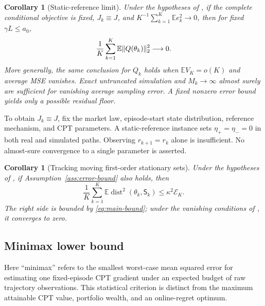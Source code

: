 \documentclass[11pt]{article}
\newtheorem{corollary}[theorem]{Corollary}
\newcommand{\E}{\mathbb E}
\newcommand{\1}{\mathbf 1}
\newcommand{\dist}{\operatorname{dist}}
\DeclarePairedDelimiter{\norm}{\lVert}{\rVert}
\newcommand{\Sta}{\mathsf S}
\begin{document}
\begin{corollary}[Static-reference limit]\label{cor:static}
Under the hypotheses of , if the complete conditional objective is fixed, $J_k\equiv J$, and
$K^{-1}\sum_{k=1}^K\E e_k^2\to0$, then for fixed $\gamma L\le a_0$,
\begin{equation}\label{eq:static-corollary}
 \frac1K\sum_{k=1}^K\E\norm{Q(\theta_k)}_2^2\longrightarrow0.
\end{equation}
More generally, the same conclusion for $Q_k$ holds when $\E V_K=o(K)$ and average MSE vanishes. Exact untruncated simulation and $M_k\to\infty$ almost surely are sufficient for vanishing average sampling error. A fixed nonzero error bound yields only a possible residual floor.
\end{corollary}
To obtain $J_k\equiv J$, fix the market law, episode-start state distribution, reference mechanism, and CPT parameters. A static-reference instance sets $\eta_+=\eta_-=0$ in both real and simulated paths. Observing $r_{k+1}=r_k$ alone is insufficient. No almost-sure convergence to a single parameter is asserted.

\begin{corollary}[Tracking moving first-order stationary sets]\label{cor:set-tracking}
Under the hypotheses of , if Assumption~\ref{ass:error-bound} also holds, then
\begin{equation}\label{eq:set-tracking}
 \frac1K\sum_{k=1}^K\E\dist^2(\theta_k,\Sta_k)
 \le\kappa^2\mathcal E_K.
\end{equation}
The right side is bounded by \eqref{eq:main-bound}; under the vanishing conditions of , it converges to zero.
\end{corollary}

\subsection{Minimax lower bound}
Here ``minimax'' refers to the smallest worst-case mean squared error for estimating one fixed-episode CPT gradient under an expected budget of raw trajectory observations. This statistical criterion is distinct from the maximum attainable CPT value, portfolio wealth, and an online-regret optimum.
\end{document}
